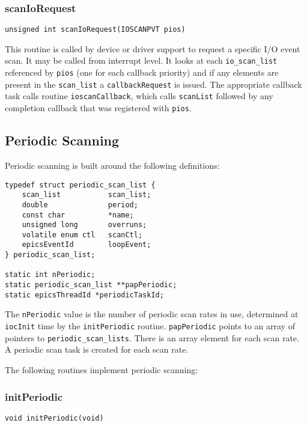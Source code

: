 \subsubsection{scanIoRequest}

\begin{verbatim}
unsigned int scanIoRequest(IOSCANPVT pios)
\end{verbatim}

This routine is called by device or driver support to request a specific I/O event scan.
It may be called from interrupt level.
It looks at each \verb|io_scan_list| referenced by \verb|pios| (one for each callback priority) and if any elements are present in the \verb|scan_list| a \verb|callbackRequest| is issued.
The appropriate callback task calls routine \verb|ioscanCallback|, which calls \verb|scanList| followed by any completion callback that was registered with \verb|pios|.

\subsection{Periodic Scanning}

Periodic scanning is built around the following definitions:

\begin{verbatim}
typedef struct periodic_scan_list {
    scan_list           scan_list;
    double              period;
    const char          *name;
    unsigned long       overruns;
    volatile enum ctl   scanCtl;
    epicsEventId        loopEvent;
} periodic_scan_list;

static int nPeriodic;
static periodic_scan_list **papPeriodic;
static epicsThreadId *periodicTaskId;
\end{verbatim}

The \verb|nPeriodic| value is the number of periodic scan rates in use, determined at \verb|iocInit| time by the \verb|initPeriodic| routine.
\verb|papPeriodic| points to an array of pointers to \verb|periodic_scan_lists|.
There is an array element for each scan rate.
A periodic scan task is created for each scan rate.

The following routines implement periodic scanning:

\subsubsection{initPeriodic}

\begin{verbatim}
void initPeriodic(void)
\end{verbatim}

